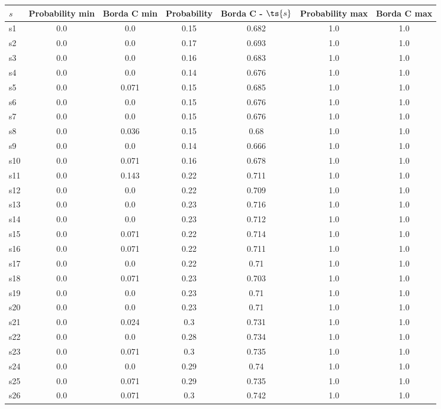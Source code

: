 \documentclass{article}
\begin{document}
\noindent\begin{tabular}{|l|c|c|c|c|c|c|}
\hline
$s$& Probability min & Borda C min & Probability & Borda C - $\ts{s}$ & Probability max & Borda C max\\
\hline
s1 &0.0 & 0.0 & 0.15 & 0.682 & 1.0 & 1.0\\
\hline
s2 &0.0 & 0.0 & 0.17 & 0.693 & 1.0 & 1.0\\
\hline
s3 &0.0 & 0.0 & 0.16 & 0.683 & 1.0 & 1.0\\
\hline
s4 &0.0 & 0.0 & 0.14 & 0.676 & 1.0 & 1.0\\
\hline
s5 &0.0 & 0.071 & 0.15 & 0.685 & 1.0 & 1.0\\
\hline
s6 &0.0 & 0.0 & 0.15 & 0.676 & 1.0 & 1.0\\
\hline
s7 &0.0 & 0.0 & 0.15 & 0.676 & 1.0 & 1.0\\
\hline
s8 &0.0 & 0.036 & 0.15 & 0.68 & 1.0 & 1.0\\
\hline
s9 &0.0 & 0.0 & 0.14 & 0.666 & 1.0 & 1.0\\
\hline
s10 &0.0 & 0.071 & 0.16 & 0.678 & 1.0 & 1.0\\
\hline
s11 &0.0 & 0.143 & 0.22 & 0.711 & 1.0 & 1.0\\
\hline
s12 &0.0 & 0.0 & 0.22 & 0.709 & 1.0 & 1.0\\
\hline
s13 &0.0 & 0.0 & 0.23 & 0.716 & 1.0 & 1.0\\
\hline
s14 &0.0 & 0.0 & 0.23 & 0.712 & 1.0 & 1.0\\
\hline
s15 &0.0 & 0.071 & 0.22 & 0.714 & 1.0 & 1.0\\
\hline
s16 &0.0 & 0.071 & 0.22 & 0.711 & 1.0 & 1.0\\
\hline
s17 &0.0 & 0.0 & 0.22 & 0.71 & 1.0 & 1.0\\
\hline
s18 &0.0 & 0.071 & 0.23 & 0.703 & 1.0 & 1.0\\
\hline
s19 &0.0 & 0.0 & 0.23 & 0.71 & 1.0 & 1.0\\
\hline
s20 &0.0 & 0.0 & 0.23 & 0.71 & 1.0 & 1.0\\
\hline
s21 &0.0 & 0.024 & 0.3 & 0.731 & 1.0 & 1.0\\
\hline
s22 &0.0 & 0.0 & 0.28 & 0.734 & 1.0 & 1.0\\
\hline
s23 &0.0 & 0.071 & 0.3 & 0.735 & 1.0 & 1.0\\
\hline
s24 &0.0 & 0.0 & 0.29 & 0.74 & 1.0 & 1.0\\
\hline
s25 &0.0 & 0.071 & 0.29 & 0.735 & 1.0 & 1.0\\
\hline
s26 &0.0 & 0.071 & 0.3 & 0.742 & 1.0 & 1.0\\

\end{tabular}
\end{document}
